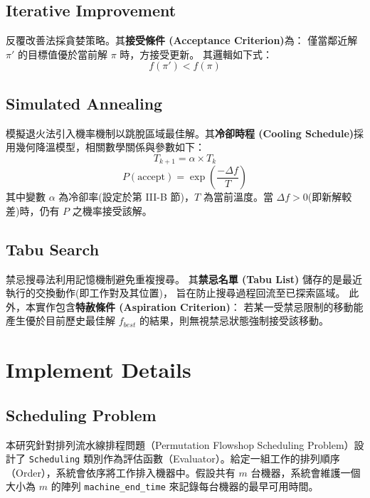 \documentclass[conference]{IEEEtran}
\begin{document}
\subsection{Iterative Improvement} 
反覆改善法採貪婪策略。其\textbf{接受條件 (Acceptance Criterion)}為：
僅當鄰近解 $\pi'$ 的目標值優於當前解 $\pi$ 時，方接受更新。
其邏輯如下式：
\begin{equation}
    f(\pi') < f(\pi)
\end{equation}




\subsection{Simulated Annealing}
模擬退火法引入機率機制以跳脫區域最佳解。其\textbf{冷卻時程 (Cooling Schedule)}採用幾何降溫模型，相關數學關係與參數如下：
\begin{equation}
    T_{k+1} = \alpha \times T_k
\end{equation}
\begin{equation}
    P(\text{accept}) = \exp\left( \frac{-\Delta f}{T} \right)
\end{equation}
其中變數 $\alpha$ 為冷卻率(設定於第 III-B 節)，$T$ 為當前溫度。當 $\Delta f > 0$(即新解較差)時，仍有 $P$ 之機率接受該解。



\subsection{Tabu Search}
禁忌搜尋法利用記憶機制避免重複搜尋。
其\textbf{禁忌名單 (Tabu List)} 儲存的是最近執行的交換動作(即工作對及其位置)，
旨在防止搜尋過程回流至已探索區域。
此外，本實作包含\textbf{特赦條件 (Aspiration Criterion)}：
若某一受禁忌限制的移動能產生優於目前歷史最佳解 $f_{best}$ 的結果，則無視禁忌狀態強制接受該移動。


\section{Implement Details}

\subsection{Scheduling Problem}
本研究針對排列流水線排程問題（Permutation Flowshop Scheduling Problem）設計了 \texttt{Scheduling} 類別作為評估函數（Evaluator）。給定一組工作的排列順序（Order），系統會依序將工作排入機器中。假設共有 $m$ 台機器，系統會維護一個大小為 $m$ 的陣列 \texttt{machine\_end\_time} 來記錄每台機器的最早可用時間。
\end{document}
